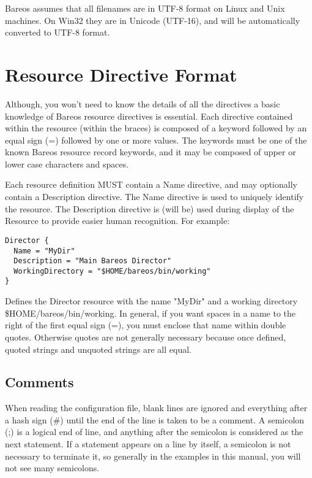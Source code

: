 Bareos assumes that all filenames are in UTF-8 format on Linux and
Unix machines. On Win32 they are in Unicode (UTF-16), and will
be automatically converted to UTF-8 format.

\section{Resource Directive Format}

Although, you won't need to know the details of all the directives a basic
knowledge of Bareos resource directives is essential. Each directive contained
within the resource (within the braces) is composed of a keyword followed by
an equal sign (=) followed by one or more values. The keywords must be one of
the known Bareos resource record keywords, and it may be composed of upper or
lower case characters and spaces.

Each resource definition MUST contain a Name directive, and may optionally
contain a Description directive. The Name directive is used to
uniquely identify the resource. The Description directive is (will be) used
during display of the Resource to provide easier human recognition. For
example:

\footnotesize
\begin{verbatim}
Director {
  Name = "MyDir"
  Description = "Main Bareos Director"
  WorkingDirectory = "$HOME/bareos/bin/working"
}
\end{verbatim}
\normalsize

Defines the Director resource with the name "MyDir" and a working directory
\$HOME/bareos/bin/working. In general, if you want spaces in a name to the
right of the first equal sign (=), you must enclose that name within double
quotes. Otherwise quotes are not generally necessary because once defined,
quoted strings and unquoted strings are all equal.

\label{Comments}
\subsection{Comments}

When reading the configuration file, blank lines are ignored and everything
after a hash sign (\#) until the end of the line is taken to be a comment. A
semicolon (;) is a logical end of line, and anything after the semicolon is
considered as the next statement. If a statement appears on a line by itself,
a semicolon is not necessary to terminate it, so generally in the examples in
this manual, you will not see many semicolons.
\label{Case1}

